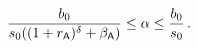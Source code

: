 \[
  \frac{b_0}{s_0 ((1 + r_{\textsf{A}})^\delta + \beta_{\textsf{A}})} \leq \alpha \leq \frac{b_0}{s_0}\,.
\]


%
%
%
%





